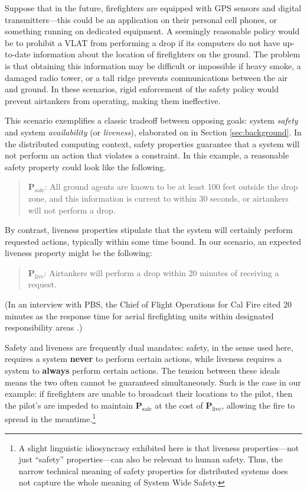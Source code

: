 \documentclass[]             %
{NASA}                       %
\theoremstyle{definition}
\begin{document}
Suppose that in the future, firefighters are equipped with GPS sensors
and digital transmitters---this could be an application on their
personal cell phones, or something running on dedicated equipment. A
seemingly reasonable policy would be to prohibit a VLAT from
performing a drop if its computers do not have up-to-date information
about the location of firefighters on the ground. The problem is that
obtaining this information may be difficult or impossible if heavy
smoke, a damaged radio tower, or a tall ridge prevents communications
between the air and ground. In these scenarios, rigid enforcement of
the safety policy would prevent airtankers from operating, making them
ineffective.

This scenario exemplifies a classic tradeoff between opposing goals:
system \emph{safety} and system \emph{availability} (or
\emph{liveness}), elaborated on in Section \ref{sec:background}. In the
distributed computing context, safety properties guarantee that a system
will not perform an action that violates a constraint. In this example,
a reasonable safety property could look like the following.

\begin{quote}
  $\textbf{P}_\textrm{safe}$: All ground agents are known to be at
  least 100 feet outside the drop zone, and this information is
  current to within 30 seconds, or airtankers will not perform a drop.
\end{quote}

\noindent By contrast, liveness properties stipulate that the system
will certainly perform requested actions, typically within some time
bound. In our scenario, an expected liveness property might be the
following:

\begin{quote}
  $\textbf{P}_\textrm{live}$:
  Airtankers will perform a drop within 20 minutes of receiving a request.
\end{quote}
(In an interview with PBS, the Chief of Flight Operations for Cal Fire
cited 20 \mbox{minutes} as the response time for aerial firefighting
units within designated responsibility areas
\cite{2021:aerialfirefighting}.)

Safety and liveness are frequently dual mandates: safety, in the sense
used here, requires a system \textbf{never} to perform certain
actions, while liveness requires a system to \textbf{always} perform
certain actions. The tension between these ideals means the two often
cannot be guaranteed simultaneously. Such is the case in our example:
if firefighters are unable to broadcast their locations to the pilot,
then the pilot's are impeded to maintain \(\textbf{P}_\textrm{safe}\)
at the cost of \(\textbf{P}_\textrm{live}\), allowing the fire to
spread in the meantime.\footnote{A slight linguistic idiosyncrasy
exhibited here is that liveness properties---not just ``safety''
properties---can also be relevant to human safety. Thus, the narrow
technical meaning of safety properties for distributed systems does
not capture the whole meaning of System Wide Safety.}
\end{document}
